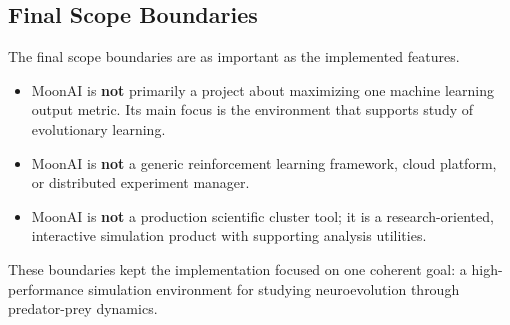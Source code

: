 \subsection{Final Scope Boundaries}

The final scope boundaries are as important as the implemented features.

\begin{itemize}[nosep]
  \item MoonAI is \textbf{not} primarily a project about maximizing one machine learning output
    metric. Its main focus is the environment that supports study of evolutionary learning.
  \item MoonAI is \textbf{not} a generic reinforcement learning framework, cloud platform, or
    distributed experiment manager.
  \item MoonAI is \textbf{not} a production scientific cluster tool; it is a research-oriented,
    interactive simulation product with supporting analysis utilities.
\end{itemize}

These boundaries kept the implementation focused on one coherent goal: a high-performance
simulation environment for studying neuroevolution through predator-prey dynamics.
